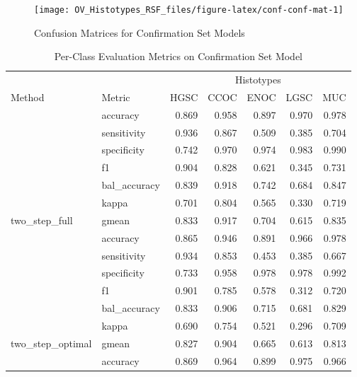 \documentclass[
]{report}
\begin{document}
\begin{figure}[H]

{\centering \texttt{[image: OV\_Histotypes\_RSF\_files/figure-latex/conf-conf-mat-1]} 

}

\caption{Confusion Matrices for Confirmation Set Models}\label{fig:conf-conf-mat}
\end{figure}

\begin{table}

\caption{\label{tab:conf-eval-per-class}Per-Class Evaluation Metrics on Confirmation Set Model}
\centering
\begin{tabular}[t]{l|l|r|r|r|r|r}
\hline
\multicolumn{2}{c|}{ } & \multicolumn{5}{c}{Histotypes} \\
\cline{3-7}
Method & Metric & HGSC & CCOC & ENOC & LGSC & MUC\\
\hline
 & accuracy & 0.869 & 0.958 & 0.897 & 0.970 & 0.978\\
\cline{2-7}
 & sensitivity & 0.936 & 0.867 & 0.509 & 0.385 & 0.704\\
\cline{2-7}
 & specificity & 0.742 & 0.970 & 0.974 & 0.983 & 0.990\\
\cline{2-7}
 & f1 & 0.904 & 0.828 & 0.621 & 0.345 & 0.731\\
\cline{2-7}
 & bal\_accuracy & 0.839 & 0.918 & 0.742 & 0.684 & 0.847\\
\cline{2-7}
 & kappa & 0.701 & 0.804 & 0.565 & 0.330 & 0.719\\
\cline{2-7}
\multirow{-7}{*}{\raggedright\arraybackslash two\_step\_full} & gmean & 0.833 & 0.917 & 0.704 & 0.615 & 0.835\\
\cline{1-7}
 & accuracy & 0.865 & 0.946 & 0.891 & 0.966 & 0.978\\
\cline{2-7}
 & sensitivity & 0.934 & 0.853 & 0.453 & 0.385 & 0.667\\
\cline{2-7}
 & specificity & 0.733 & 0.958 & 0.978 & 0.978 & 0.992\\
\cline{2-7}
 & f1 & 0.901 & 0.785 & 0.578 & 0.312 & 0.720\\
\cline{2-7}
 & bal\_accuracy & 0.833 & 0.906 & 0.715 & 0.681 & 0.829\\
\cline{2-7}
 & kappa & 0.690 & 0.754 & 0.521 & 0.296 & 0.709\\
\cline{2-7}
\multirow{-7}{*}{\raggedright\arraybackslash two\_step\_optimal} & gmean & 0.827 & 0.904 & 0.665 & 0.613 & 0.813\\
\cline{1-7}
 & accuracy & 0.869 & 0.964 & 0.899 & 0.975 & 0.966\\

\end{tabular}
\end{table}
\end{document}
